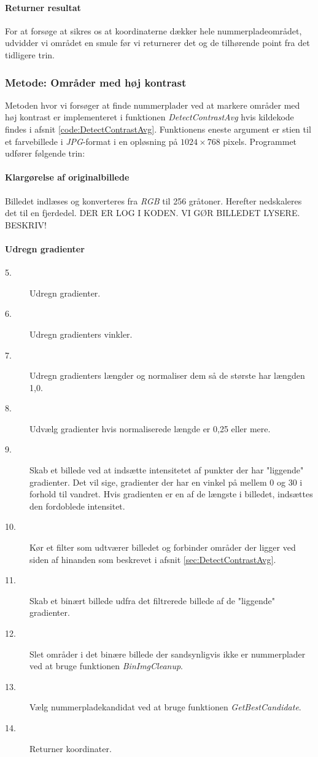 \paragraph{Returner resultat}
For at forsøge at sikres os at koordinaterne dækker hele nummerpladeområdet, udvidder vi området en smule før vi returnerer det og de tilhørende point fra det tidligere trin. 


\subsubsection{Metode: Områder med høj kontrast}
Metoden hvor vi forsøger at finde nummerplader ved at markere områder med høj kontrast er implementeret i funktionen \textit{DetectContrastAvg} hvis kildekode findes i afsnit \vref{code:DetectContrastAvg}. Funktionens eneste argument er stien til et farvebillede i \textit{JPG}-format i en opløsning på $1024 \times 768$ pixels. Programmet udfører følgende trin:

\paragraph{Klargørelse af originalbillede}
Billedet indlæses og konverteres fra \textit{RGB} til 256 gråtoner. Herefter nedskaleres det til en fjerdedel. DER ER LOG I KODEN. VI GØR BILLEDET LYSERE. BESKRIV!

\paragraph{Udregn gradienter}



\begin{description}
\item[5.] Udregn gradienter.
\item[6.] Udregn gradienters vinkler.
\item[7.] Udregn gradienters længder og normaliser dem så de største har længden 1,0.
\item[8.] Udvælg gradienter hvis normaliserede længde er 0,25 eller mere.
\item[9.] Skab et billede ved at indsætte intensitetet af punkter der har "liggende" gradienter. Det vil sige, gradienter der har en vinkel på mellem 0 og 30 i forhold til vandret. Hvis gradienten er en af de længste i billedet, indsættes den fordoblede intensitet.
\item[10.] Kør et filter som udtværer billedet og forbinder områder der ligger ved siden af hinanden som beskrevet i afsnit \ref{sec:DetectContrastAvg}.
\item[11.] Skab et binært billede udfra det filtrerede billede af de "liggende" gradienter. 
\item[12.] Slet områder i det binære billede der sandsynligvis ikke er nummerplader ved at bruge funktionen \textit{BinImgCleanup}.
\item[13.] Vælg nummerpladekandidat ved at bruge funktionen \textit{GetBestCandidate}.
\item[14.] Returner koordinater.
\end{description}



